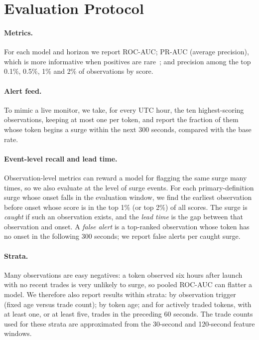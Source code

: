 \section{Evaluation Protocol}
\label{sec:protocol}

\paragraph{Metrics.}
For each model and horizon we report ROC-AUC; PR-AUC (average precision), which is more informative when positives are rare~\citep{saito2015precision}; and precision among the top 0.1\%, 0.5\%, 1\% and 2\% of observations by score.

\paragraph{Alert feed.}
To mimic a live monitor, we take, for every UTC hour, the ten highest-scoring observations, keeping at most one per token, and report the fraction of them whose token begins a surge within the next 300 seconds, compared with the base rate.

\paragraph{Event-level recall and lead time.}
Observation-level metrics can reward a model for flagging the same surge many times, so we also evaluate at the level of surge events. For each primary-definition surge whose onset falls in the evaluation window, we find the earliest observation before onset whose score is in the top 1\% (or top 2\%) of all scores. The surge is \emph{caught} if such an observation exists, and the \emph{lead time} is the gap between that observation and onset. A \emph{false alert} is a top-ranked observation whose token has no onset in the following 300 seconds; we report false alerts per caught surge.

\paragraph{Strata.}
Many observations are easy negatives: a token observed six hours after launch with no recent trades is very unlikely to surge, so pooled ROC-AUC can flatter a model. We therefore also report results within strata: by observation trigger (fixed age versus trade count); by token age; and for actively traded tokens, with at least one, or at least five, trades in the preceding 60 seconds. The trade counts used for these strata are approximated from the 30-second and 120-second feature windows.

